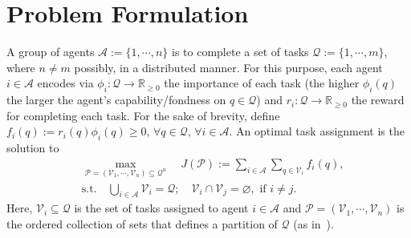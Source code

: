 \documentclass{IEEEtran}
\newcommand{\ldef}{:=}
\newcommand{\Mcal}[1]{\mathcal{#1}}
\newcommand{\Mc}[1]{\mathcal{#1}}
\newcommand{\realnonnegative}{\ensuremath{\mathbb{R}}_{\ge 0}}
\newcommand{\marginn}[1]{\marginpar{\color{blue}\tiny\ttfamily#1}}
\newcommand{\margin}[1]{\marginpar{\color{magenta}\tiny\ttfamily#1}}
\def \agt{\Mcal{A}}
\def \alloc{\Mcal{V}}
\def \rf{r}
\def \salloc{\Mc{P}}
\def \tsk{\Mc{Q}}
\newcommand{\until}[1]{\{1,\cdots, #1\}}
\begin{document}
\section{Problem Formulation} \label{sec:problem} 
A group of agents $\agt \ldef \until{n}$ is to complete a set of tasks
$\tsk \ldef \until{m}$, where $n \neq m$ possibly, 
in a distributed manner.  For this purpose,
each agent $i \in \agt$ encodes via
$\phi_i : \tsk \to \realnonnegative$ the importance of each task (the
higher $\phi_i(q)$ the larger the agent's capability/fondness on
$q \in \tsk$) and $\rf_i : \tsk \to \realnonnegative$ the 
reward for completing each task.  
For the sake of brevity, define
$f_i(q) \ldef \rf_i(q)\phi_i(q) \geq 0$, $\forall q \in \tsk$,
$\forall i \in \agt$. 
An optimal task assignment is the solution to 
\begin{subequations}
\begin{align}
	\label{eq:partition_reward} & \max_{{\salloc = (\alloc_1,\cdots,\alloc_n)  \subseteq \tsk^n}} \quad J(\salloc)\ldef \sum_{i \in \agt} \sum_{q \in \alloc_i} f_i(q),   \\
	\label{eq:partition_constraint} & \mathrm{s.t.} \quad \bigcup_{i \in \agt} \alloc_i = \tsk; \quad \alloc_i \cap \alloc_j = \varnothing,\,\, \mathrm{if}\,\, i \neq j.
\end{align}
\label{eq:partition_optimization}
\end{subequations}
Here, $\alloc_i \subseteq \tsk$ is the set of tasks assigned to agent
$i \in \agt$ and $\salloc = (\alloc_1,\cdots,\alloc_n)$ is the ordered
collection of sets that defines a partition of $\tsk$ (as in~). 

\end{document}
